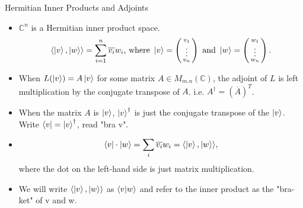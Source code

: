 \documentclass[handout, 10 pt]{beamer}
\newcommand{\icol}[1]{%
  \left(\begin{smallmatrix}#1\end{smallmatrix}\right)%
}
\begin{document}
\begin{frame}{Hermitian Inner Products and Adjoints}
\begin{itemize}
\item
$\mathbb{C}^n$ is a Hermitian inner product space.
\begin{equation} \label{inner product defn}
  \langle \ket{v},\ket{w}\rangle=\sum\limits_{i=1}^n \overline{v_i} w_i \textrm{, where }
  \ket{v}=\icol{v_1\\ \vdots\\v_n} \textrm{ and }\ket{w}=\icol{w_1\\ \vdots\\w_n}.
\end{equation}
\pause
    \item When $L(\ket{v})=A\ket{v}$ for some matrix $A \in M_{m.n}(\mathbb{C})$, the adjoint of $L$ is left multiplication by the conjugate transpose of $A$. i.e. $A^\dagger=(\overline{A})^T$.
    \pause
    \item When the matrix $A$ is $\ket{v}$, $\ket{v}^\dagger$ is just the conjugate transpose of the $\ket{v}$. Write $\bra{v}={\ket{v}}^\dagger$, read "bra v".
    \pause
    \item
    \begin{equation}
    \bra{v}\cdot \ket{w}=\sum_i \overline{v_i}w_i=\langle \ket{v},\ket{w}\rangle,
    \end{equation}
    where the dot on the left-hand side is just matrix multiplication.
    \pause
    \item We will write $\langle \ket{v},\ket{w}\rangle$ as $\braket{v|w}$ and refer to the inner product as the "bra-ket" of v and w.
\end{itemize}
\end{frame}
\end{document}
